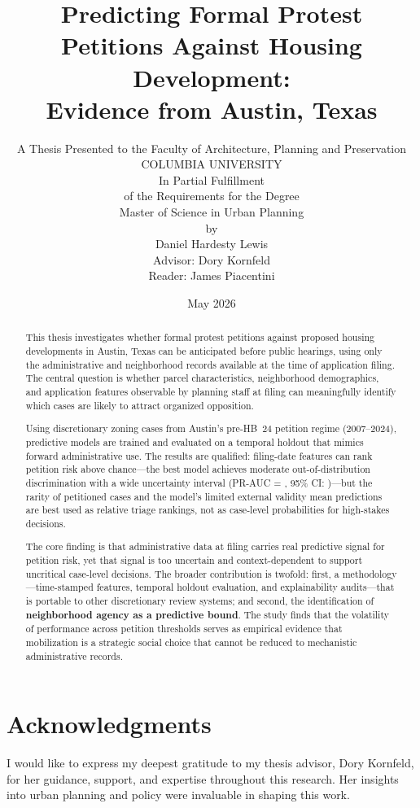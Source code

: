 \documentclass[11pt, letterpaper, oneside]{article}
\title{\vspace{-2em}\LARGE\bfseries Predicting Formal Protest Petitions Against Housing Development:\\[0.4em]
Evidence from Austin, Texas}
\author{
\normalsize A Thesis Presented to the Faculty of Architecture, Planning and Preservation\\
\normalsize COLUMBIA UNIVERSITY\\[1em]
\normalsize In Partial Fulfillment\\[0.2em]
\normalsize of the Requirements for the Degree\\[0.2em]
\normalsize Master of Science in Urban Planning\\[1.5em]
\normalsize by\\[0.5em]
\normalsize Daniel Hardesty Lewis\\[1.5em]
\normalsize Advisor: Dory Kornfeld\\[0.2em]
\normalsize Reader: James Piacentini}
\date{\normalsize May 2026}
\begin{document}
\sloppy
\maketitle

\begin{abstract}
This thesis investigates whether formal protest petitions against proposed housing developments in Austin, Texas can be anticipated before public hearings, using only the administrative and neighborhood records available at the time of application filing. The central question is whether parcel characteristics, neighborhood demographics, and application features observable by planning staff at filing can meaningfully identify which cases are likely to attract organized opposition.

Using discretionary zoning cases from Austin's pre-HB~24 petition regime (2007--2024), predictive models are trained and evaluated on a temporal holdout that mimics forward administrative use. The results are qualified: filing-date features can rank petition risk above chance---the best model achieves moderate out-of-distribution discrimination with a wide uncertainty interval (PR-AUC = \metricBootstrapFiling{}, 95\% CI: \metricBootstrapFilingCI{})---but the rarity of petitioned cases and the model's limited external validity mean predictions are best used as relative triage rankings, not as case-level probabilities for high-stakes decisions.

The core finding is that administrative data at filing carries real predictive signal for petition risk, yet that signal is too uncertain and context-dependent to support uncritical case-level decisions. The broader contribution is twofold: first, a methodology---time-stamped features, temporal holdout evaluation, and explainability audits---that is portable to other discretionary review systems; and second, the identification of \textbf{neighborhood agency as a predictive bound}. The study finds that the volatility of performance across petition thresholds serves as empirical evidence that mobilization is a strategic social choice that cannot be reduced to mechanistic administrative records.
\end{abstract}

\newpage
\section*{Acknowledgments}
I would like to express my deepest gratitude to my thesis advisor, Dory Kornfeld, for her guidance, support, and expertise throughout this research. Her insights into urban planning and policy were invaluable in shaping this work.
\end{document}
